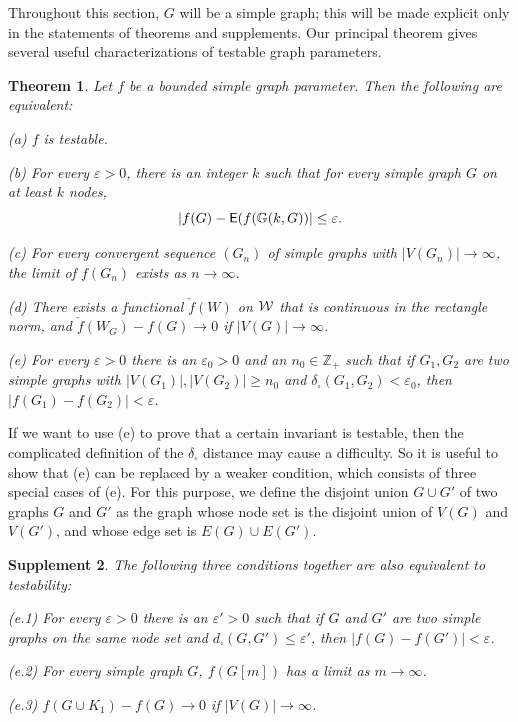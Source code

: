 \documentclass[12pt]{article}
\newtheorem{theorem}{Theorem}[section]
\newtheorem{suppl}[theorem]{Supplement}
\numberwithin{equation}{section}
\def\eps{\varepsilon}
\def\E{{\sf E}}
\def\RandG{{\mathbb G}}
\def\Z{{\mathbb Z}}
\begin{document}
Throughout this section, $G$ will  be a simple graph; this will
be made explicit only in the statements of theorems and supplements.
Our principal theorem gives several useful characterizations of
testable graph parameters.


\begin{theorem}\label{TESTABLE-PAR}
Let $f$ be a bounded simple graph parameter. Then the following are
equivalent:

\medskip

{\rm  (a)} $f$ is testable.

\medskip

{\rm (b)} For every $\eps>0$, there is an integer $k$ such that for
every {simple} graph $G$ on at least $k$ nodes,
\[
|f(G)-\E(f(\RandG(k,G))|\le\eps.
\]

\medskip

{\rm (c)} For every convergent {sequence $(G_n)$ of simple graphs}
with
$|V(G_n)|\to\infty$, the limit of $f(G_n)$ exists as $n\to\infty$.

\medskip

{\rm (d)} There exists a functional $\check{f}(W)$ on ${\cal W}$ that is
continuous in the rectangle norm, and $\check{f}(W_G)-f(G)\to 0$ if
$|V(G)|\to\infty$.

\medskip

{\rm (e)} For every $\eps>0$ there is an $\eps_0>0$ and an
$n_0\in\Z_+$ such that if $G_1,G_2$ are two {simple}
graphs with
$|V(G_1)|,|V(G_2)|\ge n_0$ and $\delta_\square(G_1,G_2)<\eps_0$, then
$|f(G_1)-f(G_2)|<\eps$.
\end{theorem}

If we want to use (e) to prove that a certain invariant is testable,
then the complicated definition of the $\delta_\square$ distance may
cause a difficulty. So it is useful to show that (e) can be replaced
by a weaker condition, which consists of three special cases of (e).
{For this purpose, we define the disjoint union $G\cup G'$ of two
graphs $G$ and $G'$ as the graph whose node set is the disjoint union
of $V(G)$ and $V(G')$, and whose edge set is $E(G)\cup E(G')$.}


\begin{suppl}\label{CONT-INF-SUPP1}
The following three conditions together are also equivalent to
testability:

\medskip

{\rm (e.1)} For every $\eps>0$ there is an $\eps'>0$ such that if $G$
and $G'$ are two {simple} graphs on the same node set and
$d_\square(G,G')\le\eps'$, then $|f(G)-f(G')|<\eps$.

\smallskip

{\rm (e.2)} For every simple graph $G$, $f(G[m])$ has a limit as
$m\to\infty$.

\smallskip

{\rm (e.3)} $f(G{\cup} K_1)-f(G)\to 0$ if $|V(G)|\to\infty$.
\end{suppl}
\end{document}
